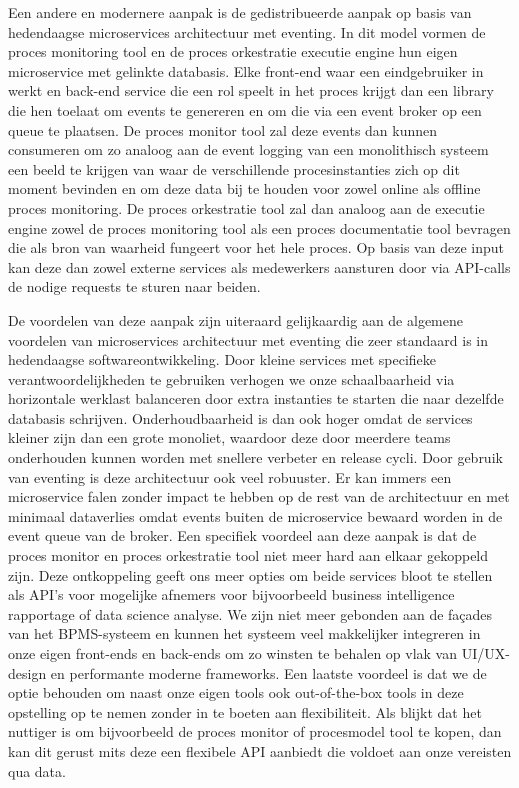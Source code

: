 Een andere en modernere aanpak is de gedistribueerde aanpak op basis van hedendaagse microservices architectuur met eventing. In dit model vormen de proces monitoring tool en de proces orkestratie executie engine hun eigen microservice met gelinkte databasis. Elke front-end waar een eindgebruiker in werkt en back-end service die een rol speelt in het proces krijgt dan een library die hen toelaat om events te genereren en om die via een event broker op een queue te plaatsen. De proces monitor tool zal deze events dan kunnen consumeren om zo analoog aan de event logging van een monolithisch systeem een beeld te krijgen van waar de verschillende procesinstanties zich op dit moment bevinden en om deze data bij te houden voor zowel online als offline proces monitoring. De proces orkestratie tool zal dan analoog aan de executie engine zowel de proces monitoring tool als een proces documentatie tool bevragen die als bron van waarheid fungeert voor het hele proces. Op basis van deze input kan deze dan zowel externe services als medewerkers aansturen door via API-calls de nodige requests te sturen naar beiden. \newline

De voordelen van deze aanpak zijn uiteraard gelijkaardig aan de algemene voordelen van microservices architectuur met eventing die zeer standaard is in hedendaagse softwareontwikkeling. Door kleine services met specifieke verantwoordelijkheden te gebruiken verhogen we onze schaalbaarheid via horizontale werklast balanceren door extra instanties te starten die naar dezelfde databasis schrijven. Onderhoudbaarheid is dan ook hoger omdat de services kleiner zijn dan een grote monoliet, waardoor deze door meerdere teams onderhouden kunnen worden met snellere verbeter en release cycli. Door gebruik van eventing is deze architectuur ook veel robuuster. Er kan immers een microservice falen zonder impact te hebben op de rest van de architectuur en met minimaal dataverlies omdat events buiten de microservice bewaard worden in de event queue van de broker. Een specifiek voordeel aan deze aanpak is dat de proces monitor en proces orkestratie tool niet meer hard aan elkaar gekoppeld zijn. Deze ontkoppeling geeft ons meer opties om beide services bloot te stellen als API’s voor mogelijke afnemers voor bijvoorbeeld business intelligence rapportage of data science analyse. We zijn niet meer gebonden aan de façades van het BPMS-systeem en kunnen het systeem veel makkelijker integreren in onze eigen front-ends en back-ends om zo winsten te behalen op vlak van UI/UX-design en performante moderne frameworks. Een laatste voordeel is dat we de optie behouden om naast onze eigen tools ook out-of-the-box tools in deze opstelling op te nemen zonder in te boeten aan flexibiliteit. Als blijkt dat het nuttiger is om bijvoorbeeld de proces monitor of procesmodel tool te kopen, dan kan dit gerust mits deze een flexibele API aanbiedt die voldoet aan onze vereisten qua data. \newline

